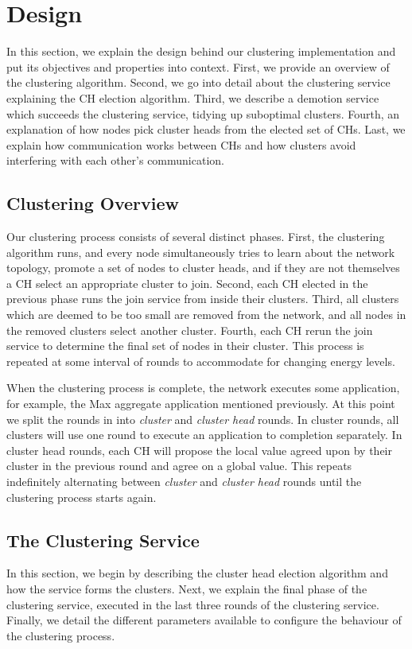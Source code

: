 \chapter{Design}
\label{chap:design}
In this section, we explain the design behind our clustering implementation and put its objectives and properties into context. First, we provide an overview of the clustering algorithm. Second, we go into detail about the clustering service explaining the CH election algorithm. Third, we describe a demotion service which succeeds the clustering service, tidying up suboptimal clusters. Fourth, an explanation of how nodes pick cluster heads from the elected set of CHs. Last, we explain how communication works between CHs and how clusters avoid interfering with each other's communication.

\section{Clustering Overview}
Our clustering process consists of several distinct phases. First, the clustering algorithm runs, and every node simultaneously tries to learn about the network topology, promote a set of nodes to cluster heads, and if they are not themselves a CH select an appropriate cluster to join. Second, each CH elected in the previous phase runs the join service from \atwo{} inside their clusters. Third, all clusters which are deemed to be too small are removed from the network, and all nodes in the removed clusters select another cluster. Fourth, each CH rerun the join service to determine the final set of nodes in their cluster. This process is repeated at some interval of rounds to accommodate for changing energy levels.

When the clustering process is complete, the network executes some application, for example, the Max aggregate application mentioned previously. At this point we split the rounds in \atwo{} into \emph{cluster} and \emph{cluster head} rounds. In cluster rounds, all clusters will use one round to execute an application to completion separately. In cluster head rounds, each CH will propose the local value agreed upon by their cluster in the previous round and agree on a global value. This repeats indefinitely alternating between \emph{cluster} and \emph{cluster head} rounds until the clustering process starts again.

\section{The Clustering Service}
In this section, we begin by describing the cluster head election algorithm and how the service forms the clusters. Next, we explain the final phase of the clustering service, executed in the last three rounds of the clustering service. Finally, we detail the different parameters available to configure the behaviour of the clustering process.


